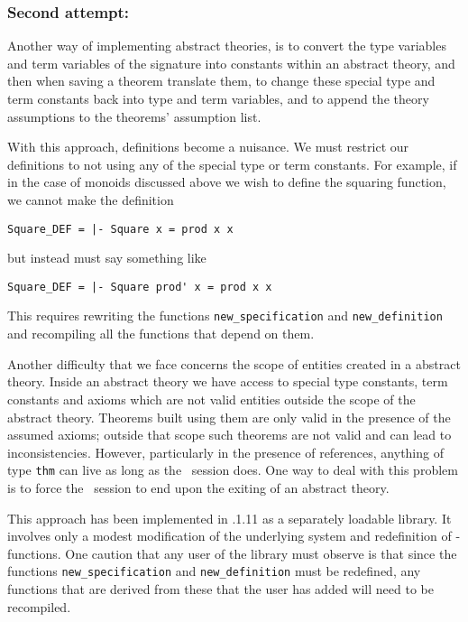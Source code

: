 \subsubsection*{Second attempt:}
Another way of implementing abstract theories, is to convert the type
variables and term variables of the signature into constants within an
abstract theory, and then when saving a theorem translate them,
to change these special type and term constants back into type and term
variables, and to append the theory assumptions to the theorems'
assumption list.

With this approach, definitions become a nuisance.  We must restrict
our definitions to not using any of the special type or term
constants.  For example, if in the case of monoids discussed above we
wish to define the squaring function, we cannot make the definition
\begin{verbatim}
Square_DEF = |- Square x = prod x x
\end{verbatim}
but instead must say something like
\begin{verbatim}
Square_DEF = |- Square prod' x = prod x x
\end{verbatim}
This requires rewriting the functions {\tt new\_specification} and
{\tt new\_definition} and recompiling all the functions that depend on
them.

Another difficulty that we face concerns the scope of entities created
in a abstract theory.  Inside an abstract theory we have access to
special type constants, term constants and axioms which are not valid
entities outside the scope of the abstract theory.  Theorems built
using them are only valid in the presence of the assumed axioms;
outside that scope such theorems are not valid and can lead to
inconsistencies.  However, particularly in the presence of references,
anything of type {\tt thm} can live as long as the \HOL\ session does.
One way to deal with this problem is to force the \HOL\ session to end
upon the exiting of an abstract theory.

This approach has been implemented in {\HOL}.1.11 as a separately
loadable library.  It involves only a modest modification of the
underlying system and redefinition of \ML-\HOL functions.  One caution
that any user of the library must observe is that since the functions 
{\tt new\_specification} and {\tt new\_definition} must be redefined,
any functions that are derived from these that the user has added will
need to be recompiled.

